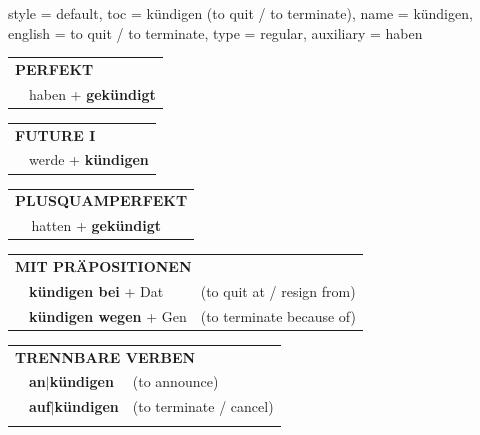 \begin{verbentry}{
  style = {default},
  toc = {kündigen (to quit / to terminate)},
  name = {kündigen},
  english = {to quit / to terminate},
  type = {regular},
  auxiliary = {haben}
}
 \begin{tabular}{rl}
     \multicolumn{2}{l}{\textbf{PERFEKT}}\\
   & haben + \textbf{gekündigt}\\
  \end{tabular}
\hfill
   \begin{tabular}{rl}
    \multicolumn{2}{l}{\textbf{FUTURE I} }\\
   & werde + \textbf{kündigen}\\
  \end{tabular}
\hfill
   \begin{tabular}{rl}
      \multicolumn{2}{l}{\textbf{PLUSQUAMPERFEKT}}\\
   & hatten + \textbf{gekündigt}\\
  \end{tabular}

   \vspace{10pt}

   \begin{tabular}{lll}
      \multicolumn{3}{l}{\textbf{MIT PRÄPOSITIONEN}}\\
& \textbf{kündigen bei} + Dat & (to quit at / resign from)\\
& \textbf{kündigen wegen} + Gen & (to terminate because of)\\
\end{tabular}
  \hfill
   \begin{tabular}{lll}
      \multicolumn{3}{l}{\textbf{TRENNBARE VERBEN}}\\
 & \textbf{an$|$kündigen} & (to announce)\\
 & \textbf{auf$|$kündigen} & (to terminate / cancel)\\
\vspace{10pt}
  \end{tabular}

  \vspace{-5pt}
\end{verbentry}
